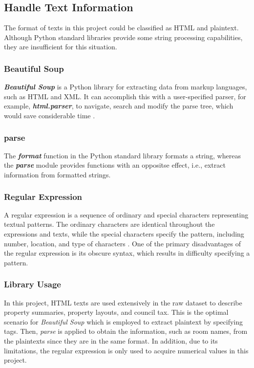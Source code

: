 \documentclass[12pt,twoside]{report}
\begin{document}
\subsection{Handle Text Information}
The format of texts in this project could be classified as HTML and plaintext. Although Python standard libraries provide some string processing capabilities, they are insufficient for this situation. 

\subsubsection{Beautiful Soup}
\textit{\textbf{Beautiful Soup}} is a Python library for extracting data from markup languages, such as HTML and XML. It can accomplish this with a user-specified parser, for example, \textbf{\textit{html.parser}}, to navigate, search and modify the parse tree, which would save considerable time \citep{RN10}. 

\subsubsection{parse}
The \textit{\textbf{format}} function in the Python standard library formats a string, whereas the \textit{\textbf{parse}} module provides functions with an oppositse effect, i.e., extract information from formatted strings.

\subsubsection{Regular Expression}
A regular expression is a sequence of ordinary and special characters representing textual patterns. The ordinary characters are identical throughout the expressions and texts, while the special characters specify the pattern, including number, location, and type of characters  \citep{RN14}. One of the primary disadvantages of the regular expression is its obscure syntax, which results in difficulty specifying a pattern. 

\subsubsection{Library Usage}
In this project, HTML texts are used extensively in the raw dataset to describe property summaries, property layouts, and council tax. This is the optimal scenario for \textit{Beautiful Soup} which is employed to extract plaintext by specifying tags. Then, \textit{parse} is applied to obtain the information, such as room names, from the plaintexts since they are in the same format. In addition, due to its limitations, the regular expression is only used to acquire numerical values in this project. 
\end{document}

